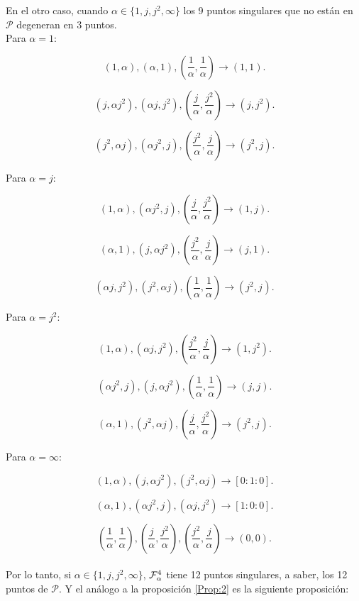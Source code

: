 En el otro caso, cuando $\alpha\in\{1,j,j^{2},\infty \}$ los 9 puntos singulares que no están en $\mathcal{P}$ degeneran en 3 puntos.
\\

Para $\alpha=1$:


$$(1,\alpha),(\alpha,1),(\frac{1}{\alpha},\frac{1}{\alpha}) \rightarrow (1,1).$$

$$(j,\alpha j^{2}),(\alpha j,j^{2}),(\frac{j}{\alpha},\frac{j^{2}}{\alpha}) \rightarrow (j,j^{2}).$$

$$(j^{2},\alpha j),(\alpha j^{2},j),(\frac{j^{2}}{\alpha},\frac{j}{\alpha}) \rightarrow (j^{2},j).$$


Para $\alpha=j$:


$$(1,\alpha),(\alpha j^{2},j),(\frac{j}{\alpha},\frac{j^{2}}{\alpha}) \rightarrow (1,j).$$

$$(\alpha,1),(j,\alpha j^{2}),(\frac{j^{2}}{\alpha},\frac{j}{\alpha}) \rightarrow (j,1).$$

$$(\alpha j,j^{2}),(j^{2},\alpha j),(\frac{1}{\alpha},\frac{1}{\alpha}) \rightarrow (j^{2},j^{}).$$


Para $\alpha=j^{2}$:


$$(1,\alpha),(\alpha j,j^{2}),(\frac{j^{2}}{\alpha},\frac{j}{\alpha}) \rightarrow (1,j^{2}).$$

$$(\alpha j^{2},j),(j,\alpha j^{2}),(\frac{1}{\alpha},\frac{1}{\alpha}) \rightarrow (j,j).$$

$$(\alpha ,1),(j^{2},\alpha j),(\frac{j}{\alpha},\frac{j^{2}}{\alpha}) \rightarrow (j^{2},j^{}).$$


Para $\alpha=\infty$:


$$(1,\alpha), (j,\alpha j^{2}),(j^{2}, \alpha j) \rightarrow [0:1:0].$$

$$(\alpha,1),(\alpha j^{2},j),(\alpha j, j^{2}) \rightarrow [1:0:0].$$

$$(\frac{1}{\alpha},\frac{1}{\alpha}),(\frac{j}{\alpha},\frac{j^{2}}{\alpha}),(\frac{j^{2}}{\alpha},\frac{j}{\alpha}) \rightarrow (0,0).$$
\\

Por lo tanto, si $\alpha\in\{1,j,j^{2},\infty \}$, $\Fol[4]{\alpha}$  tiene 12 puntos singulares, a saber, los 12 puntos de $\mathcal{P}$. Y el análogo a la proposición \ref{Prop:2} es la siguiente proposición:
\\

